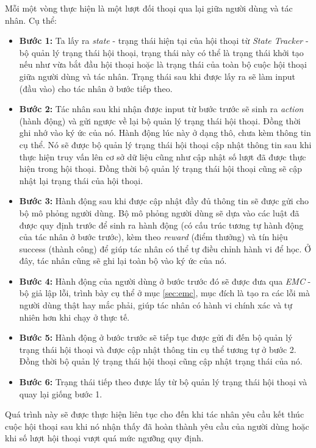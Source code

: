 Mỗi một vòng thực hiện là một lượt đối thoại qua lại giữa người dùng và tác nhân. Cụ thể:

\begin{itemize}
    \item \textbf{Bước 1:} Ta lấy ra \textit{state} - trạng thái hiện tại của hội thoại từ \textit{State Tracker} - bộ quản lý trạng thái hội thoại, trạng thái này có thể là trạng thái khởi tạo nếu như vừa bắt đầu hội thoại hoặc là trạng thái của toàn bộ cuộc hội thoại giữa người dùng và tác nhân. Trạng thái sau khi được lấy ra sẽ làm input (đầu vào) cho tác nhân ở bước tiếp theo.
    \item \textbf{Bước 2:} Tác nhân sau khi nhận được input từ bước trước sẽ sinh ra \textit{action} (hành động) và gửi ngược về lại bộ quản lý trạng thái hội thoại. Đồng thời ghi nhớ vào ký ức của nó. Hành động lúc này ở dạng thô, chưa kèm thông tin cụ thể. Nó sẽ được bộ quản lý trạng thái hội thoại cập nhật thông tin sau khi thực hiện truy vấn lên cơ sở dữ liệu cũng như cập nhật số lượt đã được thực hiện trong hội thoại. Đồng thời bộ quản lý trạng thái hội thoại cũng sẽ cập nhật lại trạng thái của hội thoại.
    \item \textbf{Bước 3:} Hành động sau khi được cập nhật đầy đủ thông tin sẽ được gửi cho bộ mô phỏng người dùng. Bộ mô phỏng người dùng sẽ dựa vào các luật đã được quy định trước để sinh ra hành động (có cấu trúc tương tự hành động của tác nhân ở bước trước), kèm theo \textit{reward} (điểm thưởng) và tín hiệu success (thành công) để giúp tác nhân có thể tự điều chỉnh hành vi để học. Ở đây, tác nhân cũng sẽ ghi lại toàn bộ vào ký ức của nó.
    \item \textbf{Bước 4:} Hành động của người dùng ở bước trước đó sẽ được đưa qua \textit{EMC} - bộ giả lập lỗi, trình bày cụ thể ở mục \ref{sec:emc}, mục đích là tạo ra các lỗi mà người dùng thật hay mắc phải, giúp tác nhân có hành vi chính xác và tự nhiên hơn khi chạy ở thực tế.
    \item \textbf{Bước 5:} Hành động ở bước trước sẽ tiếp tục được gửi đi đến bộ quản lý trạng thái hội thoại và được cập nhật thông tin cụ thể tương tự ở bước 2. Đồng thời bộ quản lý trạng thái hội thoại cũng cập nhật trạng thái của nó.
    \item \textbf{Bước 6:} Trạng thái tiếp theo được lấy từ bộ quản lý trạng thái hội thoại và quay lại giống bước 1.
\end{itemize}

Quá trình này sẽ được thực hiện liên tục cho đến khi tác nhân yêu cầu kết thúc cuộc hội thoại sau khi nó nhận thấy đã hoàn thành yêu cầu của người dùng hoặc khi số lượt hội thoại vượt quá mức ngưỡng quy định.

